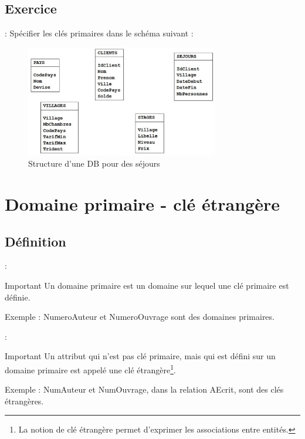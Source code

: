 \documentclass[10pt]{beamer}
\begin{document}
\subsection{Exercice}
\begin{frame}{\secname : \subsecname}
    Spécifier les clés primaires dans le schéma suivant :
    \begin{figure}
        \begin{center}
            \includegraphics[width=0.75\textwidth]{../assets/img/db_villes.pdf}
            \caption*{Structure d’une DB pour des séjours}
            \label{Fig:db_villes.pdf}
        \end{center}
    \end{figure}
\end{frame}

\section{Domaine primaire - clé étrangère}
\subsection{Définition}
\begin{frame}{\secname : \subsecname}
    \begin{alertblock}{Important}
        Un domaine primaire est un domaine sur lequel une clé primaire est définie.
    \end{alertblock}
    Exemple : NumeroAuteur et NumeroOuvrage sont des domaines primaires.
\end{frame}
\begin{frame}{\secname : \subsecname}
    \begin{alertblock}{Important}
        Un attribut qui n’est pas clé primaire, mais qui est défini sur un domaine primaire est appelé une clé étrangère\footnote{La notion de clé étrangère permet d’exprimer les associations entre entités.}.
    \end{alertblock}
    Exemple : NumAuteur et NumOuvrage, dans la relation AEcrit, sont des clés étrangères.
\end{frame}
\end{document}
